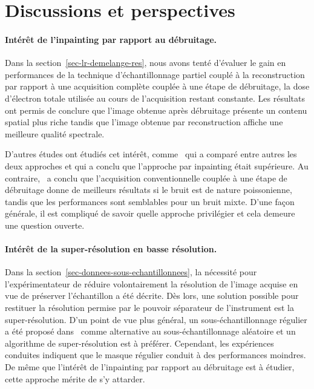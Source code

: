 \section*{Discussions et perspectives}

\paragraph{Intérêt de l'inpainting par rapport au débruitage.} Dans la section~\ref{sec-lr-demelange-res}, nous avons tenté d'évaluer le gain en performances de la technique d'échantillonnage partiel couplé à la reconstruction par rapport à une acquisition complète couplée à une étape de débruitage, la dose d'électron totale utilisée au cours de l'acquisition restant constante. Les résultats ont permis de conclure que l'image obtenue après débruitage présente un contenu spatial plus riche tandis que l'image obtenue par reconstruction affiche une meilleure qualité spectrale.

D'autres études ont étudiés cet intérêt, comme~\cite{trampert2018ultramicroscopy} qui a comparé entre autres les deux approches et qui a conclu que l'approche par inpainting était supérieure. Au contraire,~\cite{sanders2018inpainting} a conclu que l'acquisition conventionnelle couplée à une étape de débruitage donne de meilleurs résultats si le bruit est de nature poissonienne, tandis que les performances sont semblables pour un bruit mixte. D'une façon générale, il est compliqué de savoir quelle approche privilégier et cela demeure une question ouverte.

\paragraph{Intérêt de la super-résolution en basse résolution.} Dans la section~\ref{sec-donnees-sous-echantillonnees}, la nécessité pour l'expérimentateur de réduire volontairement la résolution de l'image acquise en vue de préserver l'échantillon a été décrite. Dès lors, une solution possible pour restituer la résolution permise par le pouvoir séparateur de l'instrument est la super-résolution. D'un point de vue plus général, un sous-échantillonnage régulier a été proposé dans~\cite{trampert2018ultramicroscopy} comme alternative au sous-échantillonnage aléatoire et un algorithme de super-résolution est à préférer. Cependant, les expériences conduites indiquent que le masque régulier conduit à des performances moindres. De même que l'intérêt de l'inpainting par rapport au débruitage est à étudier, cette approche mérite de s'y attarder.

